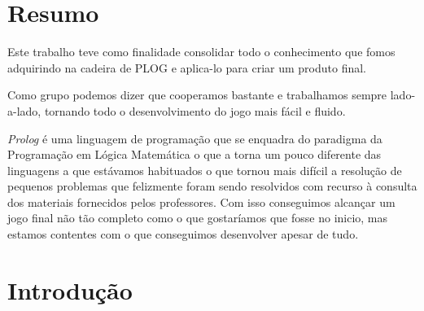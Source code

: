 \documentclass[a4paper]{article}
\begin{document}

\newpage

\section*{Resumo}

\par Este trabalho teve como finalidade consolidar todo o conhecimento que fomos adquirindo na cadeira de PLOG e aplica-lo para criar um produto final. 
\par Como grupo podemos dizer que cooperamos bastante e trabalhamos sempre lado-a-lado, tornando todo o desenvolvimento do jogo mais fácil e fluido. 
\par \textit{Prolog} é uma linguagem de programação que se enquadra do paradigma da Programação em Lógica Matemática o que a torna um pouco diferente das linguagens a que estávamos habituados o que tornou mais difícil a resolução de pequenos problemas que felizmente foram sendo resolvidos com recurso à consulta dos materiais fornecidos pelos professores. Com isso conseguimos alcançar um jogo final não tão completo como o que gostaríamos que fosse no inicio, mas estamos contentes com o que conseguimos desenvolver apesar de tudo. 
\newpage

\tableofcontents



\newpage

\section{Introdução}
\end{document}
